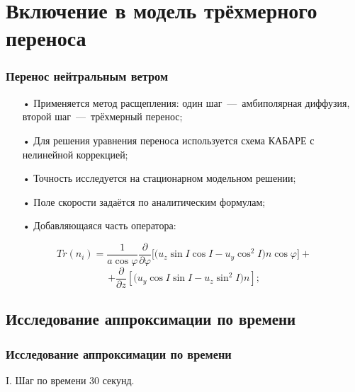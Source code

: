 \documentclass[9pt, apectratio=43,unicode]{beamer}
\begin{document}
\section{Включение в модель трёхмерного переноса}


\begin{frame}\frametitle{Перенос нейтральным ветром}

\begin{itemize}
\item[•] Применяется метод расщепления: один шаг~---~амбиполярная диффузия, второй шаг~---~трёхмерный перенос;
\item[•] Для решения уравнения переноса используется схема КАБАРЕ с нелинейной коррекцией;
\item[•] Точность исследуется на стационарном модельном решении; 
\item[•] Поле скорости задаётся по аналитическим формулам;
\item[•] Добавляющаяся часть оператора:
\end{itemize}

$$Tr(n_i) = \dfrac{1}{a\cos\varphi}\dfrac{\partial}{\partial\varphi}\bigg[\bigg(u_z\sin I \cos I - u_y\cos^2 I\bigg)n\cos\varphi\bigg]+$$ $$+\dfrac{\partial}{\partial z}\left[\bigg(u_y\cos I \sin I -u_z\sin^2 I\bigg)n\right];$$

\end{frame}

\subsection{Исследование аппроксимации по времени}
\begin{frame}\frametitle{Исследование аппроксимации по времени}
I. Шаг по времени 30 секунд.

\end{frame}
\end{document}
